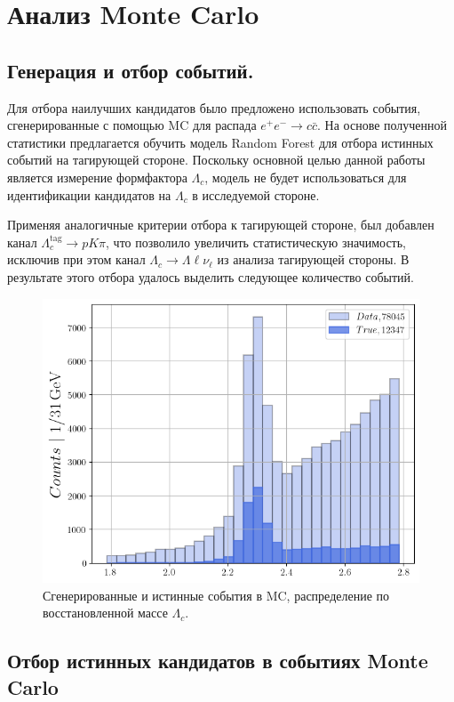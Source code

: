 \section{Анализ Monte Carlo}

\subsection*{Генерация и отбор событий.}

Для отбора наилучших кандидатов было предложено использовать события, сгенерированные с помощью MC для распада $e^+e^- \to c\bar{c}$. На основе полученной статистики предлагается обучить модель Random Forest для отбора истинных событий на тагирующей стороне. Поскольку основной целью данной работы является измерение формфактора $\Lambda_c$, модель не будет использоваться для идентификации кандидатов на $\Lambda_c$ в исследуемой стороне.

Применяя аналогичные критерии отбора к тагирующей стороне, был добавлен канал $\Lambda_c^{\text{tag}} \to p K \pi$, что позволило увеличить статистическую значимость, исключив при этом канал $\Lambda_c \to \Lambda \ell \nu_\ell$ из анализа тагирующей стороны. В результате этого отбора удалось выделить следующее количество событий.

\begin{figure}[H]
    \centering
    \includegraphics[width=0.7\linewidth]{img/mc_tr.png}
    \caption{Сгенерированные и истинные события в MC, распределение по восстановленной массе $\Lambda_c$.}
\end{figure}


\subsection{Отбор истинных кандидатов в событиях Monte Carlo}


